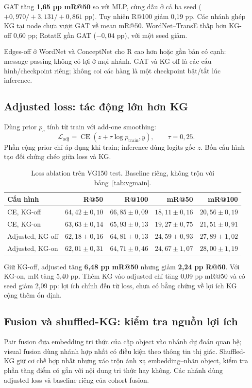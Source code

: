 GAT tăng \textbf{1,65 pp mR@50} so với MLP, cùng dấu ở cả ba seed
($+0,970/+3,131/+0,861$ pp). Tuy nhiên R@100 giảm 0,19 pp.
Các nhánh ghép KG tại node chưa vượt GAT về mean mR@50.
WordNet--TransE thấp hơn KG-off 0,60 pp; RotatE gần GAT ($-0,04$ pp),
với một seed giảm.

Edges-off ở WordNet và ConceptNet cho R cao hơn hoặc gần bản có cạnh:
message passing không có lợi ở mọi nhánh. GAT và KG-off là các cấu hình/checkpoint
riêng; không coi các hàng là một checkpoint bật/tắt lúc inference.

\subsection{Adjusted loss: tác động lớn hơn KG}
Dùng prior $p_c$ tính từ train với add-one smoothing:
\[
\mathcal L_{\mathrm{adj}}
=\operatorname{CE}\!\left(z+\tau\log p_{\mathrm{train}},y\right),
\qquad \tau=0,25.
\]
Phần cộng prior chỉ áp dụng khi train; inference dùng logits gốc $z$.
Bốn cấu hình tạo đối chứng chéo giữa loss và KG.

\begin{table}[H]\centering\small
\caption{Loss ablation trên VG150 test. Baseline riêng, không trộn với bảng~\ref{tab:vgmain}.}\label{tab:loss}
\begin{tabular}{@{}lrrrr@{}}\toprule
Cấu hình & R@50 & R@100 & mR@50 & mR@100\\\midrule
CE, KG-off & $64,42\pm0,10$ & $66,85\pm0,09$ & $18,11\pm0,16$ & $20,56\pm0,19$\\
CE, KG-on & $63,63\pm0,14$ & $65,93\pm0,13$ & $19,27\pm0,75$ & $21,51\pm0,91$\\
Adjusted, KG-off & $62,18\pm0,16$ & $64,81\pm0,13$ & $24,59\pm0,93$ & $27,89\pm1,02$\\
Adjusted, KG-on & $62,01\pm0,31$ & $64,71\pm0,46$ & $24,67\pm1,07$ & $28,00\pm1,19$\\
\bottomrule\end{tabular}\end{table}

Giữ KG-off, adjusted tăng \textbf{6,48 pp mR@50} nhưng giảm
\textbf{2,24 pp R@50}. Với KG-on, mR tăng 5,40 pp.
Thêm KG vào adjusted chỉ tăng 0,09 pp mR@50 và có seed giảm 2,09 pp:
lợi ích chính đến từ loss, chưa có bằng chứng về lợi ích KG cộng thêm ổn định.

\clearpage
\subsection{Fusion và shuffled-KG: kiểm tra nguồn lợi ích}
Pair fusion đưa embedding tri thức của cặp object vào nhánh dự đoán quan hệ;
visual fusion dùng nhánh hợp nhất có điều kiện theo thông tin thị giác.
Shuffled-KG giữ cơ chế hợp nhất nhưng xáo trộn ánh xạ embedding--nhãn object,
kiểm tra phần tăng điểm có gắn với nội dung tri thức hay không.
Các nhánh dùng adjusted loss và baseline riêng của cohort fusion.

